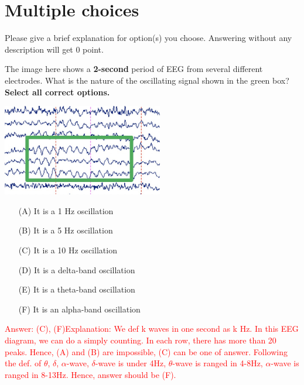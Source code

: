 \documentclass[a4 paper]{article}
\begin{document}
\section{Multiple choices}
Please give a brief explanation for option(s) you choose. Answering without any description will get 0 point.
\begin{tcolorbox}[colback=RubineRed!5!white,colframe=RubineRed!75!black]
The image here shows a \textbf{2-second} period of EEG from several different electrodes. What is the nature of the oscillating signal shown in the green box? \textbf{Select all correct options.}
\begin{multicols*}{2}
\begin{center}
    \includegraphics[height=4cm]{figure/Alpha.png}
\end{center}
\columnbreak
\begin{itemize}
    \item[(A)]It is a 1 Hz oscillation
    \item[(B)]It is a 5 Hz oscillation
    \item[(C)]It is a 10 Hz oscillation
    \item[(D)]It is a delta-band oscillation
    \item[(E)]It is a theta-band oscillation
    \item[(F)]It is an alpha-band oscillation
\end{itemize}
\end{multicols*}
\textcolor{red}{Answer: (C), (F)\newline Explanation: We def k waves in one second as k Hz. In this EEG diagram, we can do a simply counting. In each row, there has more than 20 peaks. Hence, (A) and (B) are impossible, (C) can be one of answer. Following the def. of $\theta$, $\delta$, $\alpha$-wave, $\delta$-wave is under 4Hz, $\theta$-wave is ranged in 4-8Hz, $\alpha$-wave is ranged in 8-13Hz. Hence, answer should be (F). }
\end{tcolorbox}
\end{document}
